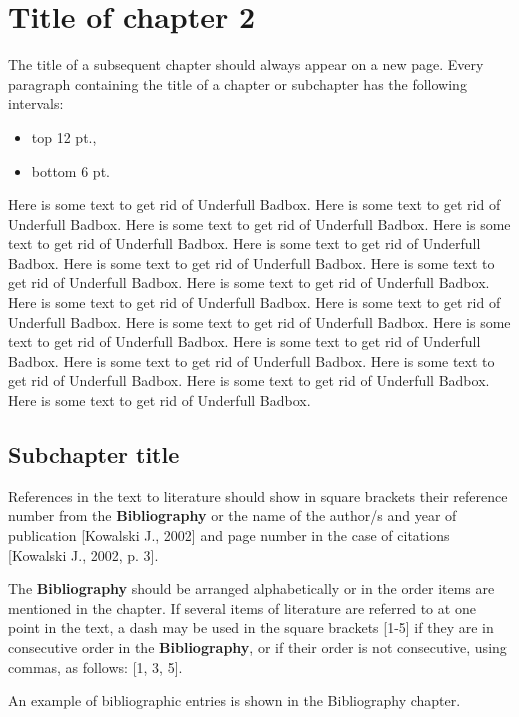 \chapter{Title of chapter 2}

The title of a subsequent chapter should always appear on a new page. Every paragraph containing the title of a chapter or subchapter has the following intervals:
\begin{itemize}
	\item top 12 pt., 
	\item bottom 6 pt.
\end{itemize}

Here is some text to get rid of Underfull Badbox. Here is some text to get rid of Underfull Badbox. Here is some text to get rid of Underfull Badbox. Here is some text to get rid of Underfull Badbox. Here is some text to get rid of Underfull Badbox. Here is some text to get rid of Underfull Badbox. Here is some text to get rid of Underfull Badbox. Here is some text to get rid of Underfull Badbox. Here is some text to get rid of Underfull Badbox. Here is some text to get rid of Underfull Badbox. Here is some text to get rid of Underfull Badbox. Here is some text to get rid of Underfull Badbox. Here is some text to get rid of Underfull Badbox. Here is some text to get rid of Underfull Badbox. Here is some text to get rid of Underfull Badbox. Here is some text to get rid of Underfull Badbox. Here is some text to get rid of Underfull Badbox.



\section{Subchapter title}

References in the text to literature should show in square brackets their reference number from the \textbf{Bibliography} \cite{hennessy2012computer-architecture} or the name of the author/s and year of publication [Kowalski J., 2002] and page number in the case of citations [Kowalski J., 2002, p. 3].

The \textbf{Bibliography} should be arranged alphabetically or in the order items are mentioned in the chapter. If several items of literature are referred to at one point in the text, a dash may be used in the square brackets [1-5] if they are in consecutive order in the \textbf{Bibliography}, or if their order is not consecutive, using commas, as follows: [1, 3, 5]. 

An example of bibliographic entries is shown in the Bibliography chapter.

